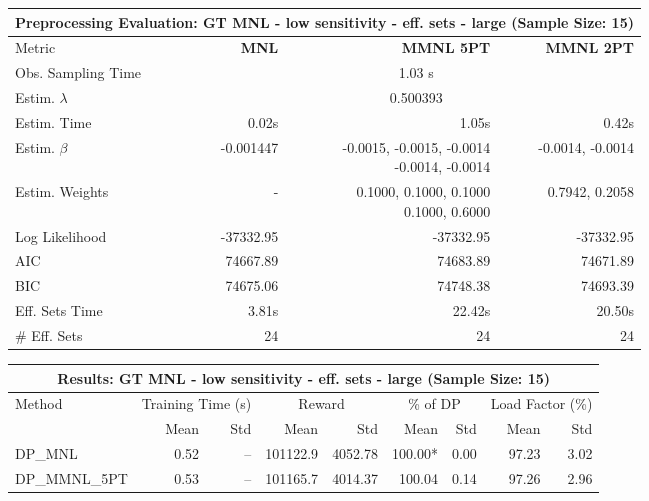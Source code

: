 
\begin{samepage}
\begin{center}
  \small
  \begin{tabular}{l|r|r|r}
    \toprule
    \multicolumn{4}{c}{\textbf{Preprocessing Evaluation: GT MNL - low sensitivity - eff. sets - large (Sample Size: 15)}} \\
    \midrule
    Metric & \textbf{MNL} & \textbf{MMNL 5PT} & \textbf{MMNL 2PT} \\
    \midrule
    Obs. Sampling Time & \multicolumn{3}{c}{1.03 s} \\
    Estim. $\lambda$ & \multicolumn{3}{c}{0.500393} \\
    Estim. Time & 0.02s & 1.05s & 0.42s \\
    Estim. $\beta$ & -0.001447 & \makecell[tr]{-0.0015, -0.0015, -0.0014 \\ -0.0014, -0.0014} & -0.0014, -0.0014 \\
    Estim. Weights & - & \makecell[tr]{0.1000, 0.1000, 0.1000 \\ 0.1000, 0.6000} & 0.7942, 0.2058 \\
    Log Likelihood & -37332.95 & -37332.95 & -37332.95 \\
    AIC & 74667.89 & 74683.89 & 74671.89 \\
    BIC & 74675.06 & 74748.38 & 74693.39 \\
    Eff. Sets Time & 3.81s & 22.42s & 20.50s \\
    \# Eff. Sets & 24 & 24 & 24 \\
    \bottomrule
  \end{tabular}
\end{center}
\begin{center}
  \small
  \begin{tabular}{l|rr|rr|rr|rr}
    \toprule
    \multicolumn{9}{c}{\textbf{Results: GT MNL - low sensitivity - eff. sets - large (Sample Size: 15)}} \\
    \midrule
    Method & \multicolumn{2}{c|}{Training Time (s)} & \multicolumn{2}{c|}{Reward} & \multicolumn{2}{c|}{\% of DP} & \multicolumn{2}{c}{Load Factor (\%)} \\
    & Mean & Std & Mean & Std & Mean & Std & Mean & Std \\
    \midrule
    DP\_MNL      &     0.52 &    -- &   101122.9 &    4052.78 & 100.00* &    0.00 &   97.23 &    3.02 \\
    DP\_MMNL\_5PT &     0.53 &    -- &   101165.7 &    4014.37 &  100.04 &    0.14 &   97.26 &    2.96 \\

\end{tabular}
\end{center}
\end{samepage}
